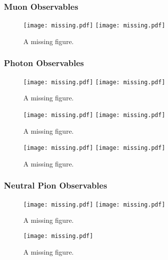 \documentclass[../main.tex]{subfiles}
\begin{document}
\subsubsection{Muon Observables}
\begin{figure}[H]
    \center
    \texttt{[image: missing.pdf]}
    \texttt{[image: missing.pdf]}
    \caption[text]{A missing figure.}
    \label{fig:muon_obs}
\end{figure}

\subsubsection{Photon Observables}
\begin{figure}[H]
    \center
    \texttt{[image: missing.pdf]}
    \texttt{[image: missing.pdf]}
    \caption[text]{A missing figure.}
    \label{fig:ph_obs0}
\end{figure}

\begin{figure}[H]
    \center
    \texttt{[image: missing.pdf]}
    \texttt{[image: missing.pdf]}
    \caption[text]{A missing figure.}
    \label{fig:ph_obs1}
\end{figure}

\begin{figure}[H]
    \center
    \texttt{[image: missing.pdf]}
    \texttt{[image: missing.pdf]}
    \caption[text]{A missing figure.}
    \label{fig:ph_obs2}
\end{figure}

\subsubsection{Neutral Pion Observables}
\begin{figure}[H]
    \center
    \texttt{[image: missing.pdf]}
    \texttt{[image: missing.pdf]}
    \caption[text]{A missing figure.}
    \label{fig:pi0_obs0}
\end{figure}

\begin{figure}[H]
    \center
    \texttt{[image: missing.pdf]}
    \caption[text]{A missing figure.}
    \label{fig:pi0_obs1}
\end{figure}
\end{document}
